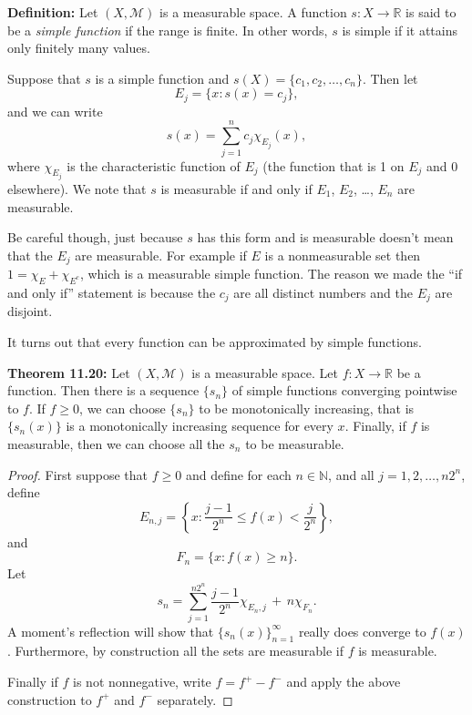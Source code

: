 \documentclass[12pt]{book}
\newcommand{\R}{{\mathbb{R}}}
\newcommand{\N}{{\mathbb{N}}}
\newcommand{\sM}{{\mathcal{M}}}
\theoremstyle{plain}
\theoremstyle{remark}
\theoremstyle{definition}
\theoremstyle{exercise}
\theoremstyle{example}
\begin{document}
\medskip

\textbf{Definition:}
Let $(X,\sM)$ is a measurable space.
A function $s \colon X \to \R$ is said to be a \emph{simple function}
if the range is finite.  In other words, $s$ is simple if
it attains only finitely many values.

\medskip

Suppose that $s$ is a simple function and $s(X) = \{ c_1, c_2, \ldots, c_n
\}$.  Then let
$$
E_j = \{ x : s(x) = c_j \} ,
$$
and we can write
$$
s(x) = \sum_{j=1}^n c_j \chi_{E_j} (x) ,
$$
where $\chi_{E_j}$ is the characteristic function of $E_j$ (the function
that is 1 on $E_j$ and 0 elsewhere).
We note that $s$ is measurable if and only if $E_1$, $E_2$, \ldots, $E_n$
are measurable.

Be careful though, just because $s$ has this form and is measurable
doesn't mean that the $E_j$ are measurable.  For example if
$E$ is a nonmeasurable set then $1 = \chi_E + \chi_{E^c}$, which is a
measurable simple function.
The reason we made the ``if and only if'' statement is because the $c_j$
are all distinct numbers and the $E_j$ are disjoint.

It turns out that every function can be approximated by simple functions.

\medskip

\textbf{Theorem 11.20:}
Let $(X,\sM)$ is a measurable space.
Let $f \colon X \to \R$ be a function.  Then there is a sequence
$\{ s_n \}$ of simple functions converging pointwise to $f$.
If $f \geq 0$, we can choose $\{ s_n \}$ to be monotonically
increasing, that is $\{ s_n(x) \}$ is a monotonically increasing sequence
for every $x$.
Finally, if $f$ is measurable, then we can choose all the $s_n$ to be
measurable.

\medskip

\begin{proof}
First 
suppose that $f \geq 0$ and define for each $n \in \N$, and all
$j=1,2,\ldots,n2^n$, define
$$
E_{n,j}
=
\left\{ x : \frac{j-1}{2^n} \leq f(x) < \frac{j}{2^n} \right\} ,
$$
and
$$
F_n = \{ x : f(x) \geq n \} .
$$
Let
$$
s_n
=
\sum_{j=1}^{n2^n}
\frac{j-1}{2^n} \chi_{E_n,j}
\,
+
\,
n
\chi_{F_n} .
$$
A moment's reflection will show that $\{ s_n(x) \}_{n=1}^\infty$ really does converge
to $f(x)$.  Furthermore, by construction all the sets
are measurable if $f$ is measurable.

Finally if $f$ is not nonnegative, write $f = f^+ - f^-$ and
apply the above construction to $f^+$ and $f^-$ separately.
\end{proof}
\end{document}
